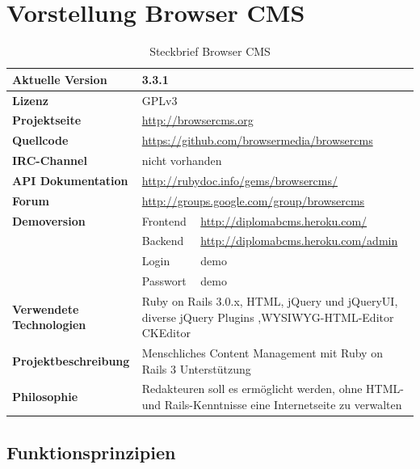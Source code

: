 \section{Vorstellung Browser CMS}
\begin{table}
\caption{Steckbrief Browser CMS}
\begin{tabular}[!ht]{|l|l|l|}
\hline
\textbf{Aktuelle Version} & \multicolumn{2}{p{10cm}|}{3.3.1} \\
\hline
\textbf{Lizenz} & \multicolumn{2}{p{10cm}|}{GPLv3} \\
\hline
\textbf{Projektseite} & \multicolumn{2}{p{10cm}|}{\href{http://browsercms.org}{http://browsercms.org}} \\
\hline
\textbf{Quellcode} & \multicolumn{2}{p{10cm}|}{\href{https://github.com/browsermedia/browsercms
}{https://github.com/browsermedia/browsercms}} \\
\hline
\textbf{IRC-Channel} & \multicolumn{2}{p{10cm}|}{nicht vorhanden} \\
\hline
\textbf{API Dokumentation} & \multicolumn{2}{p{10cm}|}{\href{http://rubydoc.info/gems/browsercms/
}{http://rubydoc.info/gems/browsercms/}} \\
\hline
\textbf{Forum} & \multicolumn{2}{p{10cm}|}{\href{http://groups.google.com/group/browsercms}{http://groups.google.com/group/browsercms}} \\
\hline
\textbf{Demoversion} & Frontend & \href{http://diplomabcms.heroku.com/}{http://diplomabcms.heroku.com/} \\
\cline{2-3}
& Backend & \href{http://diplomabcms.heroku.com/cms}{http://diplomabcms.heroku.com/admin} \\
\cline{2-3}
& Login & demo \\
\cline{2-3}
& Passwort & demo \\
\hline
\textbf{Verwendete Technologien} & \multicolumn{2}{p{10cm}|}{Ruby on Rails 3.0.x, HTML, jQuery und jQueryUI, diverse jQuery Plugins ,WYSIWYG-HTML-Editor CKEditor} \\
\hline
\textbf{Projektbeschreibung} & \multicolumn{2}{p{10cm}|}{Menschliches Content Management mit Ruby on Rails 3 Unterstützung} \\
\hline
\textbf{Philosophie} & \multicolumn{2}{p{10cm}|}{Redakteuren soll es ermöglicht werden, ohne HTML- und Rails-Kenntnisse eine Internetseite zu verwalten} \\
\hline
\end{tabular}
\end{table}
\subsection{Funktionsprinzipien}
